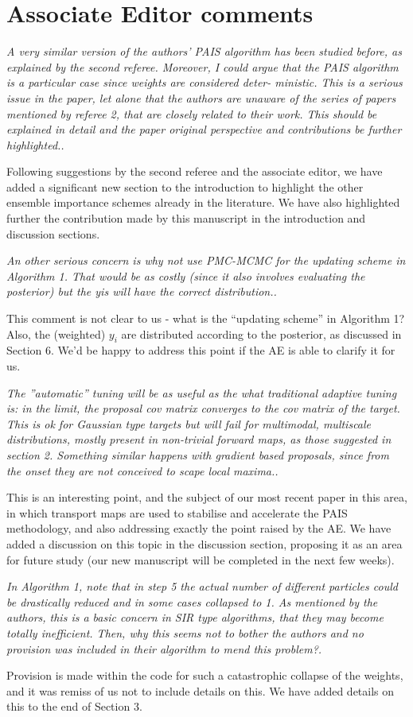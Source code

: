 \documentclass{article}
\newcommand{\comment}[2]{\vspace{0.6cm}{\bf Comment:} {\it #1.}

\vspace{0.3cm}{\bf Answer:} #2}
\begin{document}
\section*{Associate Editor comments}
\comment{A very similar version of the authors’ PAIS algorithm has been studied before, as explained by the second referee. Moreover, I could argue that the PAIS algorithm is a particular case since weights are considered deter- ministic. This is a serious issue in the paper, let alone that the authors are unaware of the series of papers mentioned by referee 2, that are closely related to their work.
This should be explained in detail and the paper original perspective and contributions be further highlighted.}{Following suggestions by the second referee and the associate editor, we have added a significant new section to the introduction to highlight the other ensemble importance schemes already in the literature. We have also highlighted further the contribution made by this manuscript in the introduction and discussion sections.}%

\comment{An other serious concern is why not use PMC-MCMC for the updating scheme in Algorithm 1. That would be as costly (since it also involves evaluating the posterior) but the yis will have the correct distribution.}{This comment is not clear to us - what is the ``updating scheme'' in Algorithm 1? Also, the (weighted) $y_i$ are distributed according to the posterior, as discussed in Section 6. We'd be happy to address this point if the AE is able to clarify it for us.}%

\comment{The ”automatic” tuning will be as useful as the what traditional adaptive tuning is: in the limit, the proposal cov matrix converges to the cov matrix of the target. This is ok for Gaussian type targets but will fail for multimodal, multiscale distributions, mostly present in non-trivial forward maps, as those suggested in section 2. Something similar happens with gradient based proposals, since from the onset they are not conceived to scape local maxima.}{This is an interesting point, and the subject of our most recent paper in this area, in which transport maps are used to stabilise and accelerate the PAIS methodology, and also addressing exactly the point raised by the AE. We have added a discussion on this topic in the discussion section, proposing it as an area for future study (our new manuscript will be completed in the next few weeks).}%

\comment{In Algorithm 1, note that in step 5 the actual number of different particles could be drastically reduced and in some cases collapsed to 1. As mentioned by the authors, this is a basic concern in SIR type algorithms, that they may become totally inefficient. Then, why this seems not to bother the authors and no provision was included in their algorithm to mend this problem?}{Provision is made within the code for such a catastrophic collapse of the weights, and it was remiss of us not to include details on this. We have added details on this to the end of Section 3.}%
\end{document}
